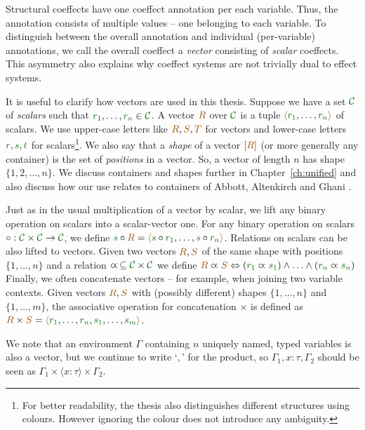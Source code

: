 Structural coeffects have one coeffect annotation per each variable. Thus, the annotation consists
of multiple values -- one belonging to each variable. To distinguish between the overall annotation
and individual (per-variable) annotations, we call the overall coeffect a \emph{vector} consisting of 
\emph{scalar} coeffects. This asymmetry also explains why coeffect systems are not trivially dual to 
effect systems.

It is useful to clarify how vectors are used in this thesis. Suppose we have a set $\C$ of
\emph{scalars} such that $\cclrd{r_1},\ldots,\cclrd{r_n} \in \C$. A vector $\aclrd{R}$ 
over $\C$ is a tuple $\alift{ \cclrd{r_1}, \ldots, \cclrd{r_n} }$ of scalars. 
We use upper-case letters like $\aclrd{R}, \aclrd{S}, \aclrd{T}$ for vectors and lower-case
letters $\cclrd{r},\cclrd{s},\cclrd{t}$ for scalars\footnote{For better readability, the thesis
also distinguishes different structures using colours. However ignoring the colour does not introduce 
any ambiguity.}. We also say that a \emph{shape} of a vector $\slift{\aclrd{R}}$ (or more generally any container) 
is the set of \emph{positions} in a vector. So, a vector of length $n$ has shape $\{ 1, 2, \ldots, n \}$. 
We discuss containers and shapes further in Chapter~\ref{ch:unified} and also discuss how our use
relates to containers of Abbott, Altenkirch and Ghani \cite{types-containers}.

Just as in the usual multiplication of a vector by scalar, we lift any binary operation on scalars into a 
scalar-vector one. For any binary operation on scalars $\circ : \C \times \C \rightarrow \C$, we define
 $\cclrd{s} \circ \aclrd{R} = \alift{ \cclrd{s}\circ\cclrd{r_1}, \ldots, \cclrd{s}\circ\cclrd{r_n}}$.
Relations on scalars can be also lifted to vectors. Given two vectors $\aclrd{R}, \aclrd{S}$ of the
same shape with positions $\{ 1, \ldots, n \}$ and a relation $\varpropto\, \subseteq \C \times \C$ we define 
$\aclrd{R} \varpropto \aclrd{S} \Leftrightarrow (\cclrd{r_1} \varpropto \cclrd{s_1}) \wedge \ldots \wedge (\cclrd{r_n} \varpropto \cclrd{s_n}) $
Finally, we often concatenate vectors -- for example, when joining two variable contexts.
Given vectors $\aclrd{R}, \aclrd{S}$ with (possibly different) shapes $\{ 1, \ldots, n \}$ and 
$\{ 1, \ldots, m \}$, the associative operation for concatenation $\times$ is defined as 
$\aclrd{R}\times\aclrd{S} = \alift{\cclrd{r_1},\ldots,\cclrd{r_n},\cclrd{s_1},\ldots,\cclrd{s_m}}$.

We note that an environment $\Gamma$ containing $n$ uniquely named, typed variables is also a vector, 
but we continue to write `$,$' for the product, so $\Gamma_1, x\!:\!\tau, \Gamma_2$ should 
be seen as $\Gamma_1 \times \langle x\!:\!\tau\rangle \times \Gamma_2$.

